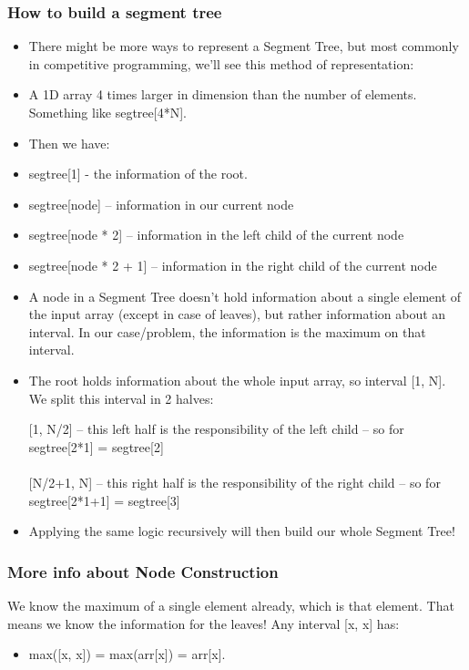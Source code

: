 \documentclass{article}
\begin{document}
\subsubsection{How to build a segment tree}
\begin{itemize}
    \item There  might  be  more  ways  to  represent  a  Segment  Tree,  but  most  commonly  in  competitive  programming,  we’ll  see  this  method  of  representation:  
    \item A  1D  array  4  times  larger  in  dimension  than  the  number  of  elements.  Something  like  segtree[4*N].  
    \item Then  we  have:  
    \item  segtree[1]  -  the  information  of  the  root.  
    \item segtree[node]  –  information  in  our  current  node  \item segtree[node  *  2]  –  information  in  the  left  child  of  the  current  node  
    \item segtree[node  *  2  +  1]  –  information  in  the  right  child  of  the  current  node
    \item A  node  in  a  Segment  Tree  doesn’t  hold  information  about  a  single  element  of  the  input  array  (except  in  case  of  leaves),  but  rather  information  about  an  interval.  In  our  case/problem,  the  information  is  the  maximum  on  that  interval.  
    \item The  root  holds  information  about  the  whole  input  array,  so  interval  [1,  N].  We  split  this  interval  in  2  halves:  
    \begin{tabbing}
        \indent{} [1,  N/2]  –  this  left  half  is  the  responsibility  of  the  left  child  –  so  for    segtree[2*1]  =  segtree[2]  \\
        \\
        \indent{} [N/2+1,  N]  –  this  right  half  is  the  responsibility  of  the  right  child  –  so  for  segtree[2*1+1]  =  segtree[3]   \\   
    \end{tabbing}

    \item Applying  the  same  logic  recursively  will  then  build  our  whole  Segment  Tree!

\end{itemize}

\subsubsection{More info about Node Construction}
 We  know  the  maximum  of  a  single  element  already,  which  is  that  element.  That  means  we  know  the  information  for  the  leaves!  Any  interval  [x,  x]  has:
\begin{itemize}
    \item max([x,  x])  =  max(arr[x])  =  arr[x].
\end{itemize}
\end{document}
